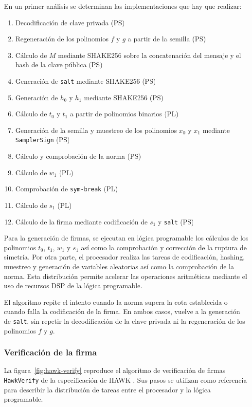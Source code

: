 En un primer análisis se determinan las implementaciones que hay que realizar:
\begin{enumerate}
    \item Decodificación de clave privada (PS)
    \item Regeneración de los polinomios $f$ y $g$ a partir de la semilla (PS)
    \item Cálculo de $M$ mediante SHAKE256 sobre la concatenación del mensaje y el hash de la clave pública (PS)
    \item Generación de \texttt{salt} mediante SHAKE256 (PS)
    \item Generación de $h_0$ y $h_1$ mediante SHAKE256 (PS)
    \item Cálculo de $t_0$ y $t_1$ a partir de polinomios binarios (PL)
    \item Generación de la semilla y muestreo de los polinomios $x_0$ y $x_1$ mediante \texttt{SamplerSign} (PS)
    \item Cálculo y comprobación de la norma (PS)
    \item Cálculo de $w_1$ (PL)
    \item Comprobación de \texttt{sym-break} (PL)
    \item Cálculo de $s_1$ (PL)
    \item Cálculo de la firma mediante codificación de $s_1$ y \texttt{salt} (PS)
\end{enumerate}

Para la generación de firmas, se ejecutan en lógica programable los cálculos
de los polinomios $t_0$, $t_1$, $w_1$ y $s_1$ así como la comprobación y corrección
de la ruptura de simetría. Por otra parte, el procesador realiza las tareas de
codificación, hashing, muestreo y generación de variables aleatorias así como
la comprobación de la norma. Esta distribución permite acelerar las operaciones aritméticas
mediante el uso de recursos DSP de la lógica programable.

El algoritmo repite el intento cuando la norma supera la cota establecida
o cuando falla la codificación de la firma. 
En ambos casos, vuelve a la generación de \texttt{salt}, 
sin repetir la decodificación de la clave privada 
ni la regeneración de los polinomios $f$ y $g$.

\subsubsection{Verificación de la firma}

La figura~\ref{fig:hawk-verify} reproduce el algoritmo de verificación
de firmas \texttt{HawkVerify} de la especificación de HAWK
\cite[p.~36, algoritmo~20]{hawk-spec-2025}. Sus pasos se utilizan
como referencia para describir la distribución de tareas entre
el procesador y la lógica programable.

